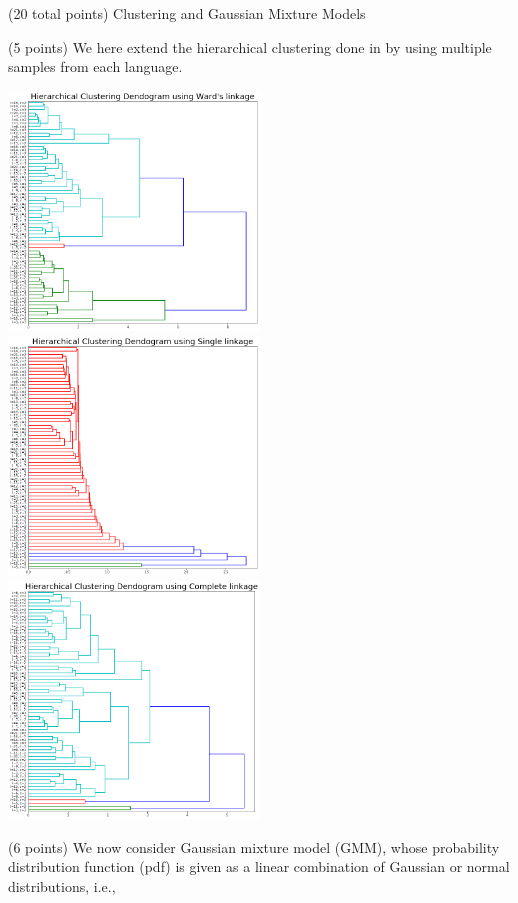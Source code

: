 \documentclass[12pt]{article}
\begin{document}
\begin{question}{(20 total points) Clustering and Gaussian Mixture Models}
\begin{subquestion}{(5 points)
       We here extend the hierarchical clustering done in  by
       using multiple samples from each language.
     }
      \begin{answerbox}{55em}
        \includegraphics[width=0.5\textwidth]{images/q34ward.png}
        \includegraphics[width=0.5\textwidth]{images/q34single.png}
        \includegraphics[width=0.5\textwidth]{images/q34complete.png}

      \end{answerbox}
  


   \end{subquestion}
   \begin{subquestion}{(6 points)
       We now consider Gaussian mixture model (GMM), whose
       probability distribution function (pdf) is given as
       a linear combination of Gaussian or normal distributions, i.e.,
     } \label{Q3.5}





\end{subquestion}
\end{question}
\end{document}
